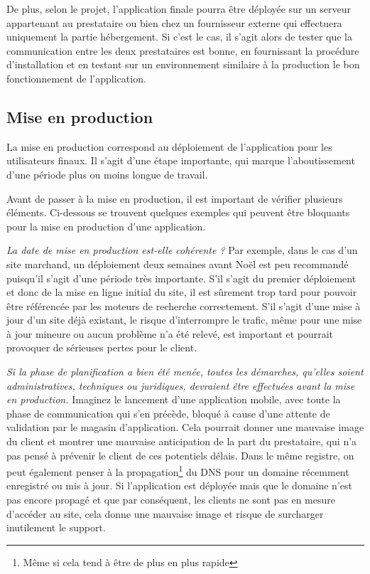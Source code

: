 De plus, selon le projet, l'application finale pourra être déployée sur un serveur appartenant au prestataire ou bien chez un fournisseur externe qui effectuera uniquement la partie hébergement. Si c'est le cas, il s'agit alors de tester que la communication entre les deux prestataires est bonne, en fournissant la procédure d'installation et en testant sur un environnement similaire à la production le bon fonctionnement de l'application.

\subsection{Mise en production}

La mise en production correspond au déploiement de l'application pour les utilisateurs finaux. Il s'agit d'une étape importante, qui marque l'aboutissement d'une période plus ou moins longue de travail.

Avant de passer à la mise en production, il est important de vérifier plusieurs éléments. Ci-dessous se trouvent quelques exemples qui peuvent être bloquants pour la mise en production d'une application.

\textit{La date de mise en production est-elle cohérente ?} Par exemple, dans le cas d'un site marchand, un déploiement deux semaines avant Noël est peu recommandé puisqu'il s'agit d'une période très importante. S'il s'agit du premier déploiement et donc de la mise en ligne initial du site, il est sûrement trop tard pour pouvoir être référencée par les moteurs de recherche correctement. S'il s'agit d'une mise à jour d'un site déjà existant, le risque d'interrompre le trafic, même pour une mise à jour mineure ou aucun problème n'a été relevé, est important et pourrait provoquer de sérieuses pertes pour le client.

\textit{Si la phase de planification a bien été menée, toutes les démarches, qu'elles soient administratives, techniques ou juridiques, devraient être effectuées avant la mise en production.} Imaginez le lancement d'une application mobile, avec toute la phase de communication qui s'en précède, bloqué à cause d'une attente de validation par le magasin d'application. Cela pourrait donner une mauvaise image du client et montrer une mauvaise anticipation de la part du prestataire, qui n'a pas pensé à prévenir le client de ces potentiels délais. Dans le même registre, on peut également penser à la propagation\footnote{Même si cela tend à être de plus en plus rapide} du \gls{DNS} pour un domaine récemment enregistré ou mis à jour. Si l'application est déployée mais que le domaine n'est pas encore propagé et que par conséquent, les clients ne sont pas en mesure d'accéder au site, cela donne une mauvaise image et risque de surcharger inutilement le support.

